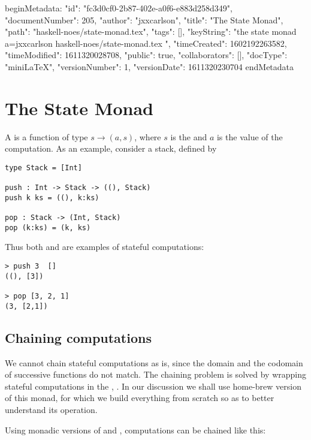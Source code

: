 beginMetadata:
{
    "id": "fc3d0cf0-2b87-402e-a0f6-e883d258d349",
    "documentNumber": 205,
    "author": "jxxcarlson",
    "title": "The State Monad",
    "path": "haskell-noes/state-monad.tex",
    "tags": [],
    "keyString": "the state monad a=jxxcarlson haskell-noes/state-monad.tex ",
    "timeCreated": 1602192263582,
    "timeModified": 1611320028708,
    "public": true,
    "collaborators": [],
    "docType": "miniLaTeX",
    "versionNumber": 1,
    "versionDate": 1611320230704
}
endMetadata
\setcounter{section}{4}

\section{The State Monad}

\innertableofcontents

A  is a function of type $s \to (a,s)$, where $s$ is the  and $a$ is the value of the computation.  As an example, consider a stack, defined by

\begin{verbatim}
type Stack = [Int]

push : Int -> Stack -> ((), Stack)
push k ks = ((), k:ks)

pop : Stack -> (Int, Stack)
pop (k:ks) = (k, ks)
\end{verbatim}

Thus both  and  are examples of stateful computations:

\begin{verbatim}
> push 3  []
((), [3])

> pop [3, 2, 1]
(3, [2,1])
\end{verbatim}


\subsection{Chaining computations}

We cannot chain stateful computations as is, since the domain and the codomain of successive functions do not match.  The chaining problem is solved by wrapping stateful computations in the , .  In our discussion we shall use home-brew version of this monad,  for which we build everything from scratch so as to better understand its operation.

Using monadic versions of  and , computations can be chained like this:


